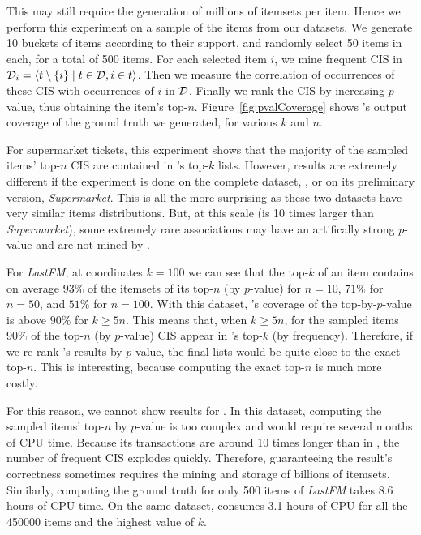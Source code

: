 This may still require the generation of millions of itemsets per item.
Hence we perform this experiment on a sample of the items from our datasets.
We generate 10 buckets of items according to their support,
and randomly select 50 items in each, for a total of 500 items.
For each selected item $i$,
we mine frequent CIS in ${\cal D}_{i} = \langle t \setminus \{i\} \mid t \in {\cal D}, i \in t\rangle$.
Then we measure the correlation of occurrences of these CIS with occurrences of $i$ in $\cal D$.
Finally we rank the CIS by increasing $p$-value, thus obtaining the item's top-$n$.
Figure~\ref{fig:pvalCoverage} shows \toppi's output coverage of the ground truth we generated,
for various $k$ and $n$.

For supermarket tickets,
this experiment shows that the majority of the sampled items' top-$n$ CIS are contained in \toppi's top-$k$ lists.
However, results are extremely different if the experiment is done on the complete dataset,
\prodassocreceipt, or on its preliminary version, {\em Supermarket}.
This is all the more surprising as these two datasets have very similar items distributions.
But, at this scale (\prodassocreceipt is 10 times larger than {\em Supermarket}),
some extremely rare associations may have an artifically strong $p$-value
and are not mined by \toppi.

For \textit{LastFM},
at coordinates $k=100$ we can see that the top-$k$ of an item contains on average $93\%$
of the itemsets of its top-$n$ (by $p$-value) for $n=10$, $71\%$ for $n=50$, and $51\%$ for $n=100$.
With this dataset, \toppi's coverage of the top-by-$p$-value is above $90\%$ for $k \ge 5n$.
This means that, when $k \ge 5n$,
for the sampled items $90\%$ of the top-$n$ (by $p$-value) CIS appear in \toppi's top-$k$ (by frequency).
Therefore, if we re-rank \toppi's results by $p$-value,
the final lists would be quite close to the exact top-$n$.
This is interesting, because computing the exact top-$n$ is much more costly.

For this reason, we cannot show results for \prodassocclient.
In this dataset, computing the sampled items' top-$n$ by $p$-value is too complex
and would require several months of CPU time.
Because its transactions are around 10 times longer than in \prodassocreceipt,
the number of frequent CIS explodes quickly.
Therefore, guaranteeing the result's correctness sometimes requires the mining and storage of billions of itemsets.
Similarly, computing the ground truth for only 500 items of {\em LastFM} takes 8.6 hours of CPU time.
On the same dataset, \toppi consumes 3.1 hours of CPU for all the \num{450000} items and the highest value of $k$.

